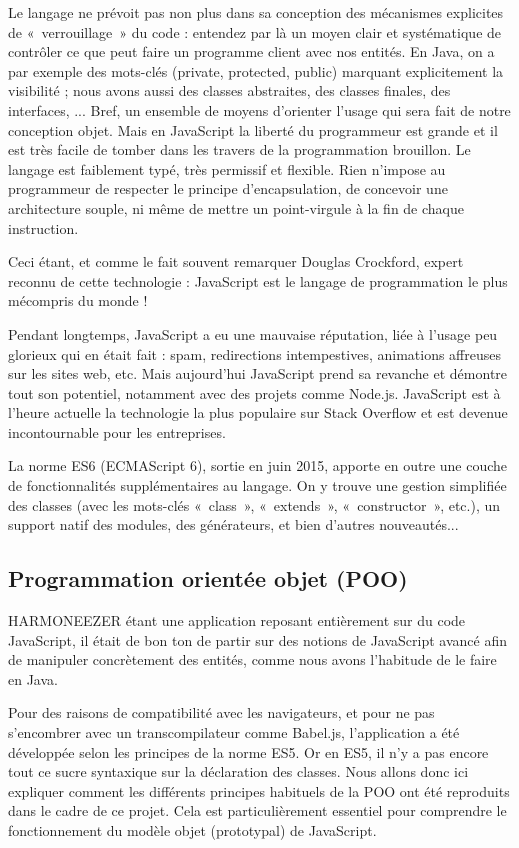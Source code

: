 \documentclass[a4paper,12pt]{article}
\begin{document}
Le langage ne prévoit pas non plus dans sa conception des mécanismes explicites de «~verrouillage~» du code : entendez par là un moyen clair et systématique de contrôler ce que peut faire un programme client avec nos entités. En Java, on a par exemple des mots-clés (private, protected, public) marquant explicitement la visibilité ; nous avons aussi des classes abstraites, des classes finales, des interfaces, ... Bref, un ensemble de moyens d'orienter l'usage qui sera fait de notre conception objet. Mais en JavaScript la liberté du programmeur est grande et il est très facile de tomber dans les travers de la programmation brouillon. Le langage est faiblement typé, très permissif et flexible. Rien n'impose au programmeur de respecter le principe d'encapsulation, de concevoir une architecture souple, ni même de mettre un point-virgule à la fin de chaque instruction.

Ceci étant, et comme le fait souvent remarquer Douglas Crockford, expert reconnu de cette technologie : JavaScript est le langage de programmation le plus mécompris du monde !

Pendant longtemps, JavaScript a eu une mauvaise réputation, liée à l'usage peu glorieux qui en était fait : spam, redirections intempestives, animations affreuses sur les sites web, etc. Mais aujourd'hui JavaScript prend sa revanche et démontre tout son potentiel, notamment avec des projets comme Node.js. JavaScript est à l'heure actuelle la technologie la plus populaire sur Stack Overflow et est devenue incontournable pour les entreprises.

\newpage

La norme ES6 (ECMAScript 6), sortie en juin 2015, apporte en outre une couche de fonctionnalités supplémentaires au langage. On y trouve une gestion simplifiée des classes (avec les mots-clés «~class~», «~extends~», «~constructor~», etc.), un support natif des modules, des générateurs, et bien d'autres nouveautés...

\subsection{Programmation orientée objet (POO)}

HARMONEEZER étant une application reposant entièrement sur du code JavaScript, il était de bon ton de partir sur des notions de JavaScript avancé afin de manipuler concrètement des entités, comme nous avons l'habitude de le faire en Java.

Pour des raisons de compatibilité avec les navigateurs, et pour ne pas s'encombrer avec un transcompilateur comme Babel.js, l'application a été développée selon les principes de la norme ES5. Or en ES5, il n'y a pas encore tout ce sucre syntaxique sur la déclaration des classes. Nous allons donc ici expliquer comment les différents principes habituels de la POO ont été reproduits dans le cadre de ce projet. Cela est particulièrement essentiel pour comprendre le fonctionnement du modèle objet (prototypal) de JavaScript.
\end{document}
